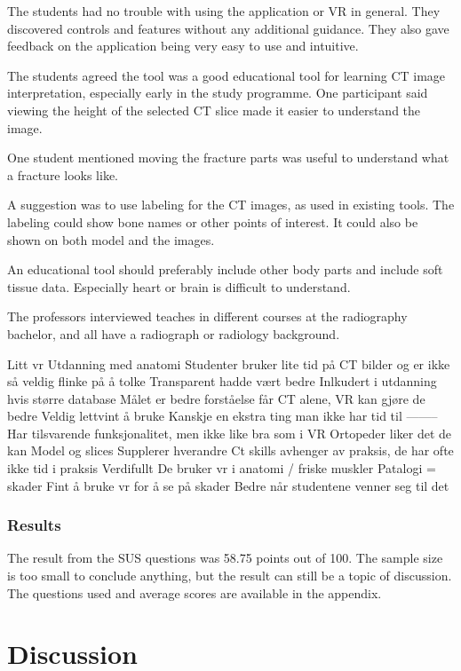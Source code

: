 \documentclass[a4paper]{report}
\begin{document}
The students had no trouble with using the application or VR in general. They discovered controls and features without any additional guidance. They also gave feedback on the application being very easy to use and intuitive.

The students agreed the tool was a good educational tool for learning CT image interpretation, especially early in the study programme.
One participant said viewing the height of the selected CT slice made it easier to understand the image.

One student mentioned moving the fracture parts was useful to understand what a fracture looks like.

A suggestion was to use labeling for the CT images, as used in existing tools. The labeling could show bone names or other points of interest. It could also be shown on both model and the images.

An educational tool should preferably include other body parts and include soft tissue data. Especially heart or brain is difficult to understand.


The professors interviewed teaches in different courses at the radiography bachelor, and all have a radiograph or radiology background. 




Litt vr
Utdanning med anatomi
Studenter bruker lite tid på CT bilder og er ikke så veldig flinke på å tolke
Transparent hadde vært bedre
Inlkudert i utdanning hvis større database
Målet er bedre forståelse får CT alene, VR kan gjøre de bedre
Veldig lettvint å bruke
Kanskje en ekstra ting man ikke har tid til
—-----
Har tilsvarende funksjonalitet, men ikke like bra som i VR
Ortopeder liker det de kan
Model og slices Supplerer hverandre
Ct skills avhenger av praksis, de har ofte ikke tid i praksis
Verdifullt
De bruker vr i anatomi / friske muskler
Patalogi = skader
Fint å bruke vr for å se på skader
Bedre når studentene venner seg til det

\subsubsection{Results}

The result from the SUS questions was 58.75 points out of 100. The sample size is too small to conclude anything, but the result can still be a topic of discussion. The questions used and average scores are available in the appendix.

\section{Discussion}
\end{document}
